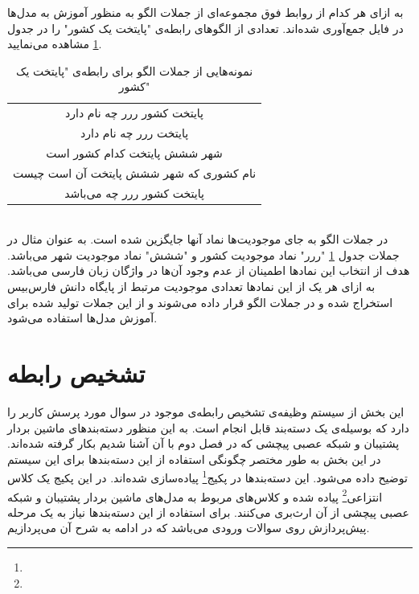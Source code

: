\noindent به ازای هر کدام از روابط فوق مجموعه‌ای از جملات الگو به منظور آموزش به مدل‌ها در فایل  جمع‌آوری شده‌اند. تعدادی از الگوهای رابطه‌ی "پایتخت یک کشور" را در جدول \ref{tab:templates_capital} مشاهده می‌نمایید.
\begin{table}[h]
	\centering
	\def\arraystretch{1.6}
	\begin{tabular}{|c|}
		\hline
		پایتخت کشور ررر چه نام دارد
		\\پایتخت ررر چه نام دارد
		\\شهر ششش پایتخت کدام کشور است
		\\نام کشوری که شهر ششش پایتخت آن است چیست
		\\پایتخت کشور ررر چه می‌باشد
		\\ \hline	 
	\end{tabular}	
	\caption{نمونه‌هایی از جملات الگو برای رابطه‌ی "پایتخت یک کشور"}
	\label{tab:templates_capital}
\end{table}
\\در جملات الگو به جای موجودیت‌ها نماد آنها جایگزین شده است. به عنوان مثال در جملات جدول \ref{tab:templates_capital} "ررر" نماد موجودیت کشور و "ششش" نماد موجودیت شهر می‌باشد. هدف از انتخاب این نمادها اطمینان از عدم وجود آن‌ها در واژگان زبان فارسی می‌باشد. به ازای هر یک از این نمادها تعدادی موجودیت مرتبط از پایگاه دانش فارس‌بیس استخراج شده و در جملات الگو قرار داده می‌شوند و از این جملات تولید شده برای آموزش مدل‌ها استفاده می‌شود.

\section{تشخیص رابطه}
این بخش از سیستم وظیفه‌ی تشخیص رابطه‌ی موجود در سوال مورد پرسش کاربر را دارد که بوسیله‌ی یک دسته‌بند قابل انجام است. به این منظور دسته‌بندهای ماشین بردار پشتیبان و شبکه عصبی پیچشی که در فصل دوم با آن آشنا شدیم بکار گرفته شده‌اند. در این بخش به طور مختصر چگونگی استفاده از این دسته‌بندها برای این سیستم توضیح داده می‌شود. این دسته‌بندها در پکیج\footnote{}  پیاده‌سازی شده‌اند. در این پکیج یک کلاس انتزاعی\footnote{} پیاده شده و کلاس‌های مربوط به مدل‌های ماشین بردار پشتیبان و شبکه عصبی پیچشی از آن ارث‌بری می‌کنند. برای استفاده از این دسته‌بندها نیاز به یک مرحله پیش‌پردازش روی سوالات ورودی می‌باشد که در ادامه به شرح آن می‌پردازیم.

